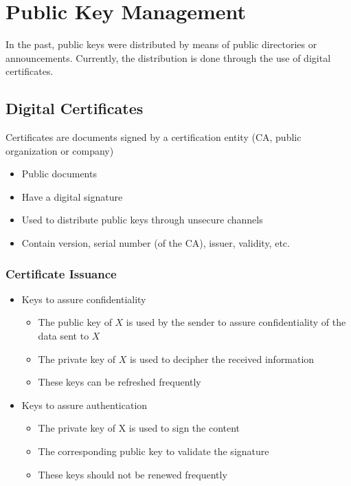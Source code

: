 \documentclass[10pt,a4paper]{report}
\begin{document}
\section{Public Key Management}
In the past, public keys were distributed by means of public directories or announcements. Currently, the distribution is done through the use of digital certificates.
\subsection{Digital Certificates}
Certificates are documents signed by a certification entity (CA, public organization or company)
\begin{itemize}
\item Public documents
\item Have a digital signature
\item Used to distribute public keys through unsecure channels
\item Contain version, serial number (of the CA), issuer, validity, etc.
\end{itemize}
\subsubsection{Certificate Issuance}
\begin{itemize}
\item Keys to assure confidentiality
\begin{itemize}
\item The public key of $X$ is used by the sender to assure confidentiality of the data sent to $X$
\item The private key of $X$ is used to decipher the received information
\item These keys can be refreshed frequently
\end{itemize}
\item Keys to assure authentication
\begin{itemize}
\item The private key of X is used to sign the content
\item The corresponding public key to validate the signature
\item These keys should not be renewed frequently
\end{itemize}
\end{itemize}
\end{document}
